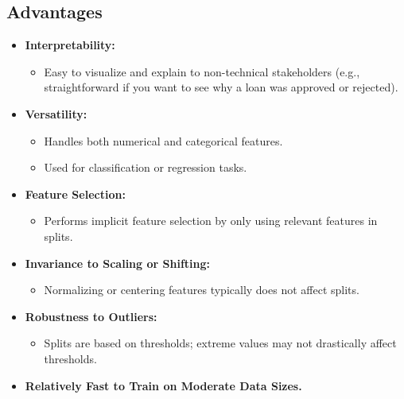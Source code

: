 \documentclass[10pt]{article}
\begin{document}
\subsection{Advantages}
\begin{itemize}
    \item \textbf{Interpretability:}
    \begin{itemize}
        \item Easy to visualize and explain to non-technical stakeholders (e.g., straightforward if you want to see why a loan was approved or rejected).
    \end{itemize}
    \item \textbf{Versatility:}
    \begin{itemize}
        \item Handles both numerical and categorical features.
        \item Used for classification or regression tasks.
    \end{itemize}
    \item \textbf{Feature Selection:}
    \begin{itemize}
        \item Performs implicit feature selection by only using relevant features in splits.
    \end{itemize}
    \item \textbf{Invariance to Scaling or Shifting:}
    \begin{itemize}
        \item Normalizing or centering features typically does not affect splits.
    \end{itemize}
    \item \textbf{Robustness to Outliers:}
    \begin{itemize}
        \item Splits are based on thresholds; extreme values may not drastically affect thresholds.
    \end{itemize}
    \item \textbf{Relatively Fast to Train on Moderate Data Sizes.}
\end{itemize}
\end{document}
